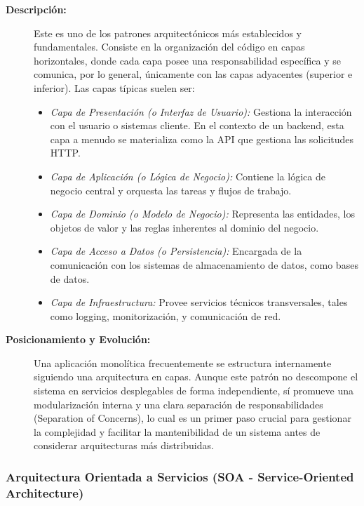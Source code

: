 \begin{description}
    \item[\textbf{Descripción:}] Este es uno de los patrones arquitectónicos más establecidos y fundamentales. Consiste en la organización del código en capas horizontales, donde cada capa posee una responsabilidad específica y se comunica, por lo general, únicamente con las capas adyacentes (superior e inferior). Las capas típicas suelen ser:
    \begin{itemize}
        \item \textit{Capa de Presentación (o Interfaz de Usuario):} Gestiona la interacción con el usuario o sistemas cliente. En el contexto de un backend, esta capa a menudo se materializa como la API que gestiona las solicitudes HTTP.
        \item \textit{Capa de Aplicación (o Lógica de Negocio):} Contiene la lógica de negocio central y orquesta las tareas y flujos de trabajo.
        \item \textit{Capa de Dominio (o Modelo de Negocio):} Representa las entidades, los objetos de valor y las reglas inherentes al dominio del negocio.
        \item \textit{Capa de Acceso a Datos (o Persistencia):} Encargada de la comunicación con los sistemas de almacenamiento de datos, como bases de datos.
        \item \textit{Capa de Infraestructura:} Provee servicios técnicos transversales, tales como logging, monitorización, y comunicación de red.
    \end{itemize}
    \item[\textbf{Posicionamiento y Evolución:}] Una aplicación monolítica frecuentemente se estructura internamente siguiendo una arquitectura en capas. Aunque este patrón no descompone el sistema en servicios desplegables de forma independiente, sí promueve una modularización interna y una clara separación de responsabilidades (Separation of Concerns), lo cual es un primer paso crucial para gestionar la complejidad y facilitar la mantenibilidad de un sistema antes de considerar arquitecturas más distribuidas.
\end{description}

\subsubsection*{Arquitectura Orientada a Servicios (SOA - Service-Oriented Architecture)}

